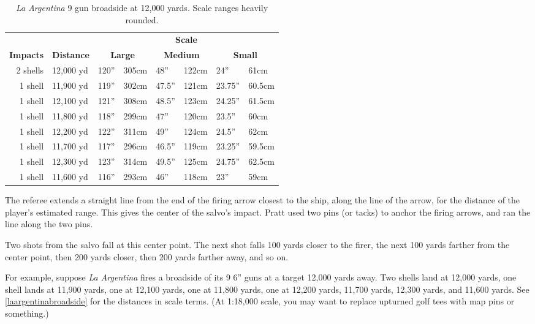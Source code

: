 \documentclass[twocolumn]{article}
\begin{document}
\begin{table*}
  \caption{\emph{La Argentina} 9 gun broadside at 12,000 yards. Scale ranges heavily rounded.}
  \label{laargentinabroadside}
  \centering
  \begin{tabular}{rl|ll|ll|ll}
  & & \multicolumn{6}{c}{\textbf{Scale}} \\
  \textbf{Impacts} &
  \textbf{Distance} &
  \multicolumn{2}{c}{\textbf{Large}} &
  \multicolumn{2}{c}{\textbf{Medium}} &
  \multicolumn{2}{c}{\textbf{Small}} \\
  2 shells & 12,000 yd & 120'' & 305cm & 48''   & 122cm & 24''    & 61cm \\
  1 shell  & 11,900 yd & 119'' & 302cm & 47.5'' & 121cm & 23.75'' & 60.5cm \\
  1 shell  & 12,100 yd & 121'' & 308cm & 48.5'' & 123cm & 24.25'' & 61.5cm \\
  1 shell  & 11,800 yd & 118'' & 299cm & 47''   & 120cm & 23.5''  & 60cm \\
  1 shell  & 12,200 yd & 122'' & 311cm & 49''   & 124cm & 24.5''  & 62cm \\
  1 shell  & 11,700 yd & 117'' & 296cm & 46.5'' & 119cm & 23.25'' & 59.5cm \\
  1 shell  & 12,300 yd & 123'' & 314cm & 49.5'' & 125cm & 24.75'' & 62.5cm \\
  1 shell  & 11,600 yd & 116'' & 293cm & 46''   & 118cm & 23''    & 59cm \\
  \end{tabular}
\end{table*}

The referee extends a straight line from the end of the firing arrow
closest to the ship, along the line of the arrow, for the distance of
the player's estimated range. This gives the center of the salvo's
impact. Pratt used two pins (or tacks) to anchor the firing arrows, and
ran the line along the two pins.

Two shots from the salvo fall at this center point. The next shot falls
100 yards closer to the firer, the next 100 yards farther from the
center point, then 200 yards closer, then 200 yards farther away, and so on.

For example, suppose \emph{La Argentina} fires a broadside of its 9 6''
guns at a target 12,000 yards away. Two shells land at 12,000 yards, one
shell lands at 11,900 yards, one at 12,100 yards, one at 11,800 yards,
one at 12,200 yards, 11,700 yards, 12,300 yards, and 11,600 yards. See
\autoref{laargentinabroadside} for the distances in scale terms. (At
1:18,000 scale, you may want to replace upturned golf tees with map pins
or something.)
\end{document}
